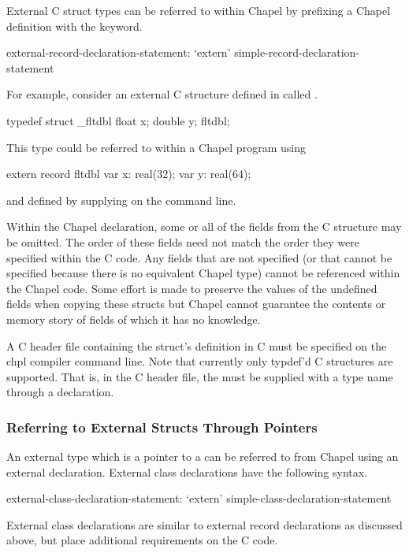 External C struct types can be referred to within Chapel by prefixing
a Chapel  definition with the  keyword.
\begin{syntax}
external-record-declaration-statement:
  `extern' simple-record-declaration-statement
\end{syntax}

For example, consider an external C structure defined in  called .
\begin{chapel}
    typedef struct _fltdbl {
      float x;
      double y;
    } fltdbl;
\end{chapel}
This type could be referred to within a Chapel program using
\begin{chapel}
   extern record fltdbl {
     var x: real(32);
     var y: real(64);
   }
\end{chapel}
\noindent
and defined by supplying  on the  command line.

Within the Chapel declaration, some or all of the fields from the C
structure may be omitted.  The order of these fields need not match
the order they were specified within the C code.  Any fields that are
not specified (or that cannot be specified because there is no
equivalent Chapel type) cannot be referenced within the Chapel code.  Some
effort is made to preserve the values of the undefined fields when copying
these structs but Chapel cannot guarantee the contents or memory story of
fields of which it has no knowledge.

A C header file containing the struct's definition in C must be specified on the
chpl compiler command line.  Note that currently only typdef'd C structures are
supported.  That is, in the C header file, the  must be supplied
with a type name through a  declaration.

\subsubsection{Referring to External Structs Through Pointers}
\label{Referring_to_External_Structs_Through_Pointers}

An external type which is a pointer to a  can be referred to from
Chapel using an external  declaration.  External class declarations
have the following syntax.
\begin{syntax}
external-class-declaration-statement:
  `extern' simple-class-declaration-statement
\end{syntax}
External class declarations are similar to external record declarations as
discussed above, but place additional requirements on the C code.

